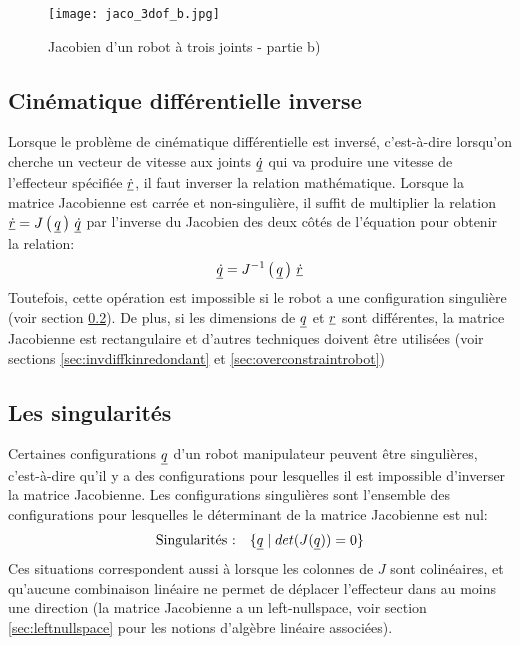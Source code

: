 \begin{figure}[H]
	\centering
	\texttt{[image: jaco\_3dof\_b.jpg]}
	\caption{Jacobien d'un robot à trois joints - partie b)}
	\label{fig:jaco_3dof_b}
\end{figure}



\subsection{Cinématique différentielle inverse}

Lorsque le problème de cinématique différentielle est inversé, c'est-à-dire lorsqu'on cherche un vecteur de vitesse aux joints $\underline{\dot{q}}$ qui va produire une vitesse de l'effecteur spécifiée $\underline{\dot{r}}$, il faut inverser la relation mathématique. Lorsque la matrice Jacobienne est carrée et non-singulière, il suffit de multiplier la relation $\underline{\dot{r}} = J\left( \, \underline{q} \, \right) \, \underline{\dot{q}}$ par l'inverse du Jacobien des deux côtés de l'équation pour obtenir la relation:
%
\begin{align}
	\underline{\dot{q}} = J^{-1}\left( \, \underline{q} \, \right) \, \underline{\dot{r}}
\end{align}
%
Toutefois, cette opération est impossible si le robot a une configuration singulière (voir section \ref{sec:singu}). De plus, si les dimensions de $\underline{q}$ et $\underline{r}$ sont différentes, la matrice Jacobienne est rectangulaire et d'autres techniques doivent être utilisées (voir sections \ref{sec:invdiffkinredondant} et \ref{sec:overconstraintrobot})


\subsection{Les singularités}
\label{sec:singu}
Certaines configurations $\underline{q}$ d'un robot manipulateur peuvent être singulières, c'est-à-dire qu'il y a des configurations pour lesquelles il est impossible d'inverser la matrice Jacobienne. Les configurations singulières sont l'ensemble des configurations pour lesquelles le déterminant de la matrice Jacobienne est nul:
\begin{align}
	\text{Singularités :} \quad \{  \underline{q} \; | \; det(J(\underline{q})) = 0 \}
\end{align}
Ces situations correspondent aussi à lorsque les colonnes de $J$ sont colinéaires, et qu'aucune combinaison linéaire ne permet de déplacer l'effecteur dans au moins une direction (la matrice Jacobienne a un left-nullspace, voir section \ref{sec:leftnullspace} pour les notions d'algèbre linéaire associées).


